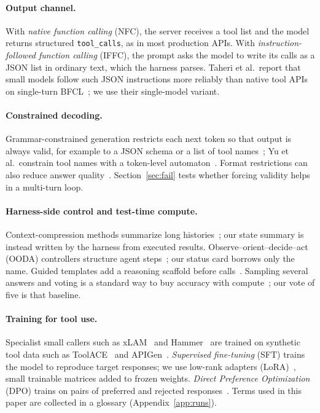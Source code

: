 \documentclass[11pt]{article}
\begin{document}
\paragraph{Output channel.} With \emph{native function calling} (NFC), the server receives a tool list and the model returns structured \texttt{tool\_calls}, as in most production APIs. With \emph{instruction-followed function calling} (IFFC), the prompt asks the model to write its calls as a JSON list in ordinary text, which the harness parses. Taheri et al.\ report that small models follow such JSON instructions more reliably than native tool APIs on single-turn BFCL~\cite{taheri2026iffc}; we use their single-model variant.

\paragraph{Constrained decoding.} Grammar-constrained generation restricts each next token so that output is always valid, for example to a JSON schema or a list of tool names~\cite{willard2023outlines,dong2026xgrammar2}; Yu et al.\ constrain tool names with a token-level automaton~\cite{yu2026ptc}. Format restrictions can also reduce answer quality~\cite{tam2024format}. Section~\ref{sec:fail} tests whether forcing validity helps in a multi-turn loop.

\paragraph{Harness-side control and test-time compute.} Context-compression methods summarize long histories~\cite{kang2025acon}; our state summary is instead written by the harness from executed results. Observe--orient--decide--act (OODA) controllers structure agent steps~\cite{guo2026ooda}; our status card borrows only the name. Guided templates add a reasoning scaffold before calls~\cite{he2025gst}. Sampling several answers and voting is a standard way to buy accuracy with compute~\cite{snell2024testtime}; our vote of five is that baseline.

\paragraph{Training for tool use.} Specialist small callers such as xLAM~\cite{zhang2024xlam} and Hammer~\cite{ye2025hammer} are trained on synthetic tool data such as ToolACE~\cite{liu2024toolace} and APIGen~\cite{liu2024apigen}. \emph{Supervised fine-tuning} (SFT) trains the model to reproduce target responses; we use low-rank adapters (LoRA)~\cite{hu2021lora}, small trainable matrices added to frozen weights. \emph{Direct Preference Optimization} (DPO) trains on pairs of preferred and rejected responses~\cite{rafailov2023dpo,jung2025diatool}. Terms used in this paper are collected in a glossary (Appendix~\ref{app:runs}).
\end{document}
